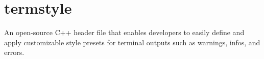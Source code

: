 \chapter{termstyle}
\hypertarget{md__2_users_2arnold_8zhou_2_documents_2_v_s_c_2_commandline_2termstyle_2_r_e_a_d_m_e}{}\label{md__2_users_2arnold_8zhou_2_documents_2_v_s_c_2_commandline_2termstyle_2_r_e_a_d_m_e}
\label{md__2_users_2arnold_8zhou_2_documents_2_v_s_c_2_commandline_2termstyle_2_r_e_a_d_m_e_autotoc_md0}%
%
An open-\/source C++ header file that enables developers to easily define and apply customizable style presets for terminal outputs such as warnings, infos, and errors. 